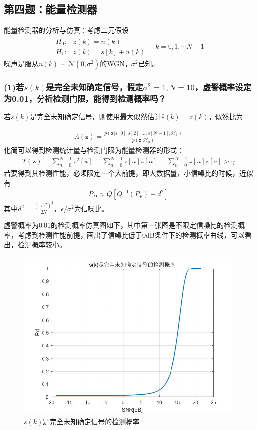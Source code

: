 \documentclass[fontset=windows]{article}
\numberwithin{figure}{section}
\begin{document}
\subsection{第四题：能量检测器}

能量检测器的分析与仿真：考虑二元假设
\begin{align*}
	\begin{matrix}
		H_0: & z(k)=n(k)      \\
		H_1: & z(k)=s[k]+n(k)
	\end{matrix}\quad k=0,1,\cdots N-1
\end{align*}
噪声是服从\(n(k)\sim \mathcal{N}(0,\sigma^2)\)的WGN，\(\sigma^2\)已知。

\subsubsection*{(1)若\(s(k)\)是完全未知确定信号，假定\(\sigma^2=1,N=10\)，虚警概率设定为0.01，分析检测门限，能得到检测概率吗？}

若\(s(k)\)是完全未知确定信号，则使用最大似然估计\(\hat{s}(k)=z(k)\)，似然比为

\begin{align*}
	\Lambda(\mathbf{z})=\frac{p(\mathbf{z}|\hat{s}[0],\hat{s}[2],\ldots,\hat{s}[N-1],\mathcal{H}_1)}{p(\mathbf{z}|\mathcal{H}_0)}
\end{align*}
化简可以得到检测统计量与检测门限为能量检测器的形式：
\begin{align*}
	T(\mathbf{z})=\sum_{n=0}^{N-1}z^2[n]=\sum_{n=0}^{N-1}z[n]z[n]=\sum_{n=0}^{N-1}z[n]\hat{s}[n]>\gamma
\end{align*}
若要得到其检测性能，必须限定一个大前提，即大数据量，小信噪比的时候，近似有
\begin{align*}
	P_D\approx Q[Q^{-1}(P_F)-d^2]
\end{align*}
其中\(d^2=\frac{(\epsilon/\sigma^2)^2}{2N}\)，\(\epsilon/\sigma^2\)为信噪比。

虚警概率为0.01的检测概率仿真图如下，其中第一张图是不限定信噪比的检测概率，考虑到检测性能前提，画出了信噪比低于0dB条件下的检测概率曲线，可以看出，检测概率较小。
\begin{figure}[H]
	\centering
	\includegraphics[scale=0.5]{fig4.1.jpg}
	\caption{\(s(k)\)是完全未知确定信号的检测概率}
	\label{6.4.1}
\end{figure}
\end{document}
